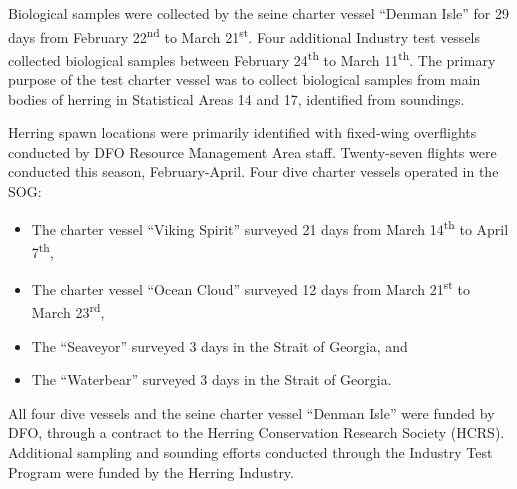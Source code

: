 Biological samples were collected by the seine charter vessel ``Denman Isle'' for 29 days from February 22\textsuperscript{nd} to March 21\textsuperscript{st}.
Four additional Industry test vessels collected biological samples between February 24\textsuperscript{th} to March 11\textsuperscript{th}.
The primary purpose of the test charter vessel was to collect biological samples from main bodies of herring in Statistical Areas 14 and 17, identified from soundings.

Herring spawn locations were primarily identified with fixed-wing overflights conducted by DFO Resource Management Area staff.
Twenty-seven flights were conducted this season, February-April. 
Four dive charter vessels operated in the SOG:
\begin{itemize}
\item The charter vessel ``Viking Spirit'' surveyed 21 days from March 14\textsuperscript{th} to April 7\textsuperscript{th},
\item The charter vessel ``Ocean Cloud'' surveyed 12 days from March 21\textsuperscript{st} to March 23\textsuperscript{rd},
\item The ``Seaveyor'' surveyed 3 days in the Strait of Georgia, and
\item The ``Waterbear'' surveyed 3 days in the Strait of Georgia.
\end{itemize}

All four dive vessels and the seine charter vessel ``Denman Isle'' were funded by DFO, through a contract to the Herring Conservation Research Society (HCRS).
Additional sampling and sounding efforts conducted through the Industry Test Program were funded by the Herring Industry.
